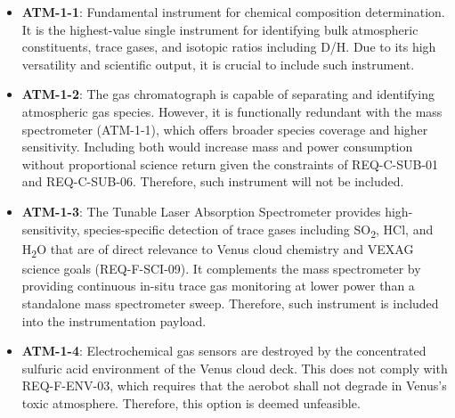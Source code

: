 \begin{itemize}
    \item \textbf{ATM-1-1}: Fundamental instrument for chemical composition determination. It is the highest-value single instrument for identifying bulk atmospheric constituents, trace gases, and isotopic ratios including D/H. Due to its high versatility and scientific output, it is crucial to include such instrument. 
    
    \item \textbf{ATM-1-2}: The gas chromatograph is capable of separating and identifying atmospheric gas species. However, it is functionally redundant with the mass spectrometer (ATM-1-1), which offers broader species coverage and higher sensitivity. Including both would increase mass and power consumption without proportional science return given the constraints of REQ-C-SUB-01 and REQ-C-SUB-06. Therefore, such instrument will not be included.
    
    \item \textbf{ATM-1-3}: The Tunable Laser Absorption Spectrometer provides high-sensitivity, species-specific detection of trace gases including SO\textsubscript{2}, HCl, and H\textsubscript{2}O that are of direct relevance to Venus cloud chemistry and VEXAG science goals (REQ-F-SCI-09). It complements the mass spectrometer by providing continuous in-situ trace gas monitoring at lower power than a standalone mass spectrometer sweep. Therefore, such instrument is included into the instrumentation payload. 
    
    \item \textbf{ATM-1-4}: Electrochemical gas sensors are destroyed by the concentrated sulfuric acid environment of the Venus cloud deck. This does not comply with REQ-F-ENV-03, which requires that the aerobot shall not degrade in Venus's toxic atmosphere. Therefore, this option is deemed unfeasible. 
\end{itemize}

